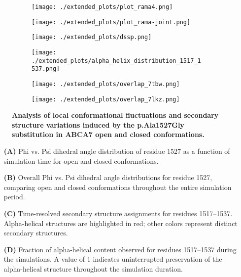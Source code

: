 \begin{figure}[H]
    \begin{subfigure}[t]{.6\textwidth}
        \caption{}
        \texttt{[image: ./extended\_plots/plot\_rama4.png]}        
    \end{subfigure}
    \begin{subfigure}[t]{.4\textwidth}
        \caption{}
        \texttt{[image: ./extended\_plots/plot\_rama-joint.png]}        
    \end{subfigure}
    \begin{subfigure}[t]{.5\textwidth}
        \caption{}
        \texttt{[image: ./extended\_plots/dssp.png]}        
    \end{subfigure}
    \begin{subfigure}[t]{.45\textwidth}
        \caption{}
        \texttt{[image: ./extended\_plots/alpha\_helix\_distribution\_1517\_1537.png]}        
    \end{subfigure}
    \begin{subfigure}[t]{.45\textwidth}
        \caption{}
        \texttt{[image: ./extended\_plots/overlap\_7tbw.png]}        
    \end{subfigure}
    \begin{subfigure}[t]{.45\textwidth}
        \caption{}
        \texttt{[image: ./extended\_plots/overlap\_7lkz.png]}        
    \end{subfigure}
    \caption{
        \textbf{Analysis of local conformational fluctuations and secondary structure variations induced by the p.Ala1527Gly substitution in ABCA7 open and closed conformations.}\\
        }
        \label{fig:md_simulations_2}
    \end{figure}
    \begin{itemize}
        \item[\textbf{(A)}] Phi vs. Psi dihedral angle distribution of residue 1527 as a function of simulation time for open and closed conformations.
        \item[\textbf{(B)}] Overall Phi vs. Psi dihedral angle distributions for residue 1527, comparing open and closed conformations throughout the entire simulation period.
        \item[\textbf{(C)}] Time-resolved secondary structure assignments for residues 1517–1537. Alpha-helical structures are highlighted in red; other colors represent distinct secondary structures.
        \item[\textbf{(D)}] Fraction of alpha-helical content observed for residues 1517–1537 during the simulations. A value of 1 indicates uninterrupted preservation of the alpha-helical structure throughout the simulation duration.
    \end{itemize}

